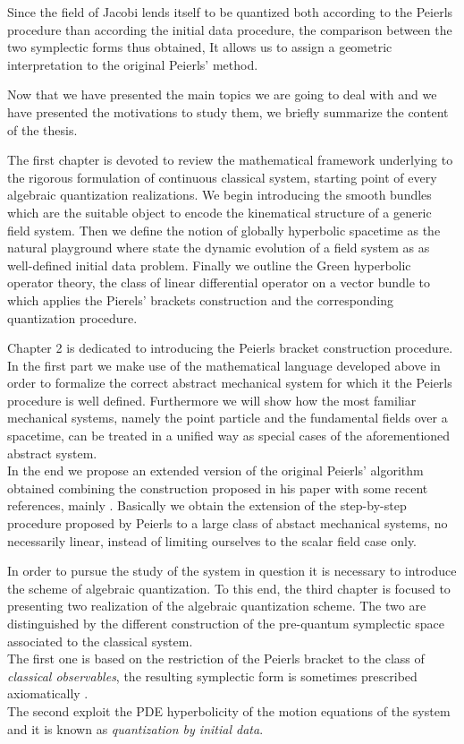 \documentclass[Main]{subfiles}
\begin{document}
Since the field of Jacobi lends itself to be quantized both according to the Peierls procedure than according the initial data procedure,
the comparison between the two symplectic forms thus obtained,
It allows us to assign a geometric interpretation to the original Peierls' method.

\vspace{3mm}
Now that we have presented the main topics we are going to deal with and we have presented the motivations to study them, we briefly summarize the content of the thesis.

The first chapter is devoted to review the mathematical framework  underlying to the rigorous formulation of continuous classical system, starting point of every algebraic quantization realizations.
We begin introducing the smooth bundles which are the suitable object to encode the kinematical structure of a generic field system.
Then we define the notion of globally hyperbolic spacetime as the natural playground where state the dynamic evolution of a field system as as well-defined initial data problem.
Finally we outline the Green hyperbolic operator theory, the class of linear differential operator on a vector bundle to which applies the Pierels' brackets construction and the corresponding quantization procedure.

Chapter 2 is dedicated to introducing the Peierls bracket construction procedure.
In the first part we make use of the mathematical language developed above in order to formalize the correct abstract mechanical system for which it the Peierls procedure is well defined. Furthermore we will show how the most familiar mechanical systems, namely the point particle and the fundamental fields over a spacetime, can be treated in a unified way as special cases of the aforementioned abstract system.
\\
In the end we propose an extended version of the original Peierls' algorithm obtained combining the construction proposed in his paper\cite{Peierls1952} with some recent references, mainly \cite{Marolf1993}\cite{Dewitt1999}\cite{Forger2005}\cite{Sharan2010}\cite{Khavkine2014}.
Basically we obtain the extension of the step-by-step procedure proposed by Peierls to a large class of abstact mechanical systems, no necessarily linear, instead of limiting ourselves to the scalar field case only.

In order to pursue the study of the system in question it is necessary to introduce the scheme of algebraic quantization.
To this end, the third chapter is focused to presenting two realization of the algebraic quantization scheme.
The two are distinguished by the different construction of the pre-quantum symplectic space associated to the classical system.
\\
The first one is based on the restriction of the Peierls bracket to the class of \emph{classical observables}, the resulting symplectic form is sometimes prescribed axiomatically \cite{Dewitt1999}\cite{Esposito}\cite{Benini}.\\
The second exploit the PDE hyperbolicity of the motion equations of the system and it is known as \emph{quantization by initial data}\cite{Wald1994}.
\end{document}
